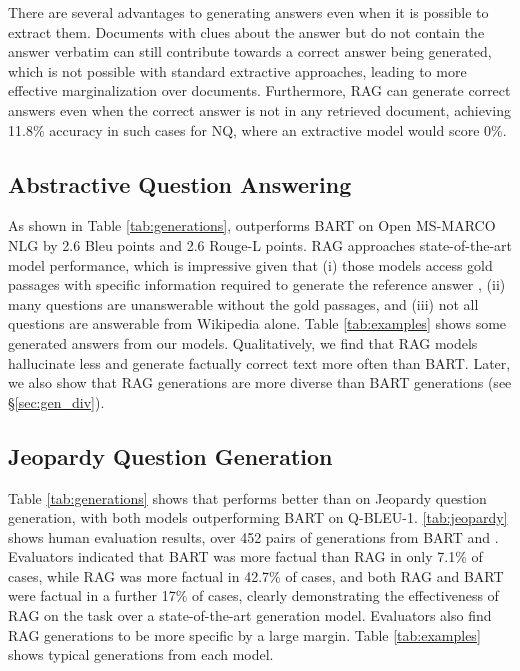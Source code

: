 There are several advantages to generating answers even when it is possible to extract them. Documents with clues about the answer but do not contain the answer verbatim can still contribute towards a correct answer being generated, which is not possible with standard extractive approaches, leading to more effective marginalization over documents. 
Furthermore, RAG can generate correct answers even when the correct answer is not in any retrieved document, achieving 11.8\% accuracy in such cases for NQ, where an extractive model would score 0\%. 


\subsection{Abstractive Question Answering}

As shown in Table \ref{tab:generations}, \raganswer{} outperforms BART on Open MS-MARCO NLG by 2.6 Bleu points and 2.6 Rouge-L points. 
RAG approaches state-of-the-art model performance, which is impressive given that (i) those models access gold passages with specific information required to generate the reference answer
, (ii) many questions are unanswerable without the gold passages, and (iii) not all questions are answerable from Wikipedia alone. Table \ref{tab:examples} shows some generated answers from our models. Qualitatively, we find that RAG models hallucinate less and generate factually correct text more often than BART. Later, we also show that RAG generations are more diverse than BART generations (see \S\ref{sec:gen_div}). 

\subsection{Jeopardy Question Generation}
\label{sec:fact_generation_results}
Table \ref{tab:generations} shows that \ragtoken{} performs better than \raganswer{} on Jeopardy question generation, with both models outperforming BART on Q-BLEU-1.
 \ref{tab:jeopardy} shows human evaluation results, over 452 pairs of generations from BART and \ragtoken{}. Evaluators indicated that BART was more factual than RAG in only 7.1\% of cases, while RAG was more factual in 42.7\% of cases, and both RAG and BART were factual in a further 17\% of cases, clearly demonstrating the effectiveness of RAG on the task over a state-of-the-art generation model. Evaluators also find RAG generations to be more specific by a large margin. Table \ref{tab:examples} shows typical generations from each model.



